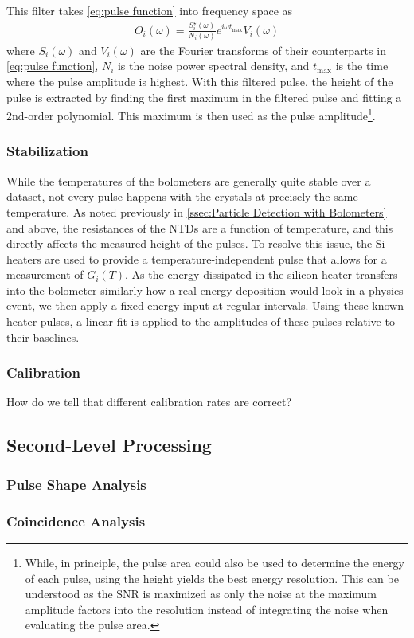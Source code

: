 This filter takes \autoref{eq:pulse function} into frequency space as
\begin{align}
    O_i(\omega)=\frac{S_i^\star(\omega)}{N_i(\omega)}e^{i\omega t_{\textrm{max}}}V_i(\omega)
\end{align}
where $S_i(\omega)$ and $V_i(\omega)$ are the Fourier transforms of their counterparts in \autoref{eq:pulse function}, $N_i$ is the noise power spectral density, and $t_\textrm{max}$ is the time where the pulse amplitude is highest.
With this filtered pulse, the height of the pulse is extracted by finding the first maximum in the filtered pulse and fitting a 2nd-order polynomial.
This maximum is then used as the pulse amplitude\footnote{While, in principle, the pulse area could also be used to determine the energy of each pulse, using the height yields the best energy resolution.
This can be understood as the SNR is maximized as only the noise at the maximum amplitude factors into the resolution instead of integrating the noise when evaluating the pulse area.}.

\subsubsection*{Stabilization}
\label{ssec:Stabilization}

While the temperatures of the bolometers are generally quite stable over a dataset, not every pulse happens with the crystals at precisely the same temperature.
As noted previously in \autoref{ssec:Particle Detection with Bolometers} and above, the resistances of the NTDs are a function of temperature, and this directly affects the measured height of the pulses.
To resolve this issue, the Si heaters are used to provide a temperature-independent pulse that allows for a measurement of $G_i(T)$.
As the energy dissipated in the silicon heater transfers into the bolometer similarly how a real energy deposition would look in a physics event, we then apply a fixed-energy input \cite{ALESSANDRELLO1998454:Si-heater} at regular intervals.
Using these known heater pulses, a linear fit is applied to the amplitudes of these pulses relative to their baselines.

\subsubsection{Calibration}
How do we tell that different calibration rates are correct?
\label{ssec:Calibration}
\subsection{Second-Level Processing}
\subsubsection{Pulse Shape Analysis}
\subsubsection{Coincidence Analysis}



